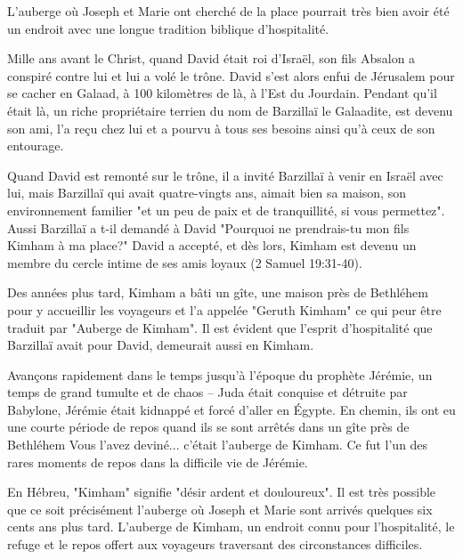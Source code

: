 

L'auberge où Joseph et Marie ont cherché de la place pourrait très bien avoir été un endroit avec une longue tradition biblique d'hospitalité.

Mille ans avant le Christ, quand David était roi d'Israël, son fils Absalon a conspiré contre lui et lui a volé le trône. David s'est alors enfui de Jérusalem pour se cacher en Galaad, à 100 kilomètres de là, à l'Est du Jourdain. Pendant qu'il était là, un riche propriétaire terrien du nom de Barzillaï le Galaadite, est devenu son ami, l'a reçu chez lui et a pourvu à tous ses besoins ainsi qu'à ceux de son entourage.

Quand David est remonté sur le trône, il a invité Barzillaï à venir en Israël avec lui, mais Barzillaï qui avait quatre-vingts ans, aimait bien sa maison, son environnement familier "et un peu de paix et de tranquillité, si vous permettez". Aussi Barzillaï a t-il demandé à David "Pourquoi ne prendrais-tu mon fils Kimham à ma place?" David a accepté, et dès lors, Kimham est devenu un membre du cercle intime de ses amis loyaux (2 Samuel 19:31-40).

Des années plus tard, Kimham a bâti un gîte, une maison près de Bethléhem pour y accueillir les voyageurs et l'a appelée "Geruth Kimham" ce qui peur être traduit par "Auberge de Kimham". Il est évident que l'esprit d'hospitalité que Barzillaï avait pour David, demeurait aussi en Kimham.

Avançons rapidement dans le temps jusqu'à l'époque du prophète Jérémie, un temps de grand tumulte et de chaos – Juda était conquise et détruite par Babylone, Jérémie était kidnappé et forcé d'aller en Égypte. En chemin, ils ont eu une courte période de repos quand ils se sont arrêtés dans un gîte près de Bethléhem Vous l'avez deviné... c'était l'auberge de Kimham. Ce fut l'un des rares moments de repos dans la difficile vie de Jérémie.

En Hébreu, "Kimham" signifie "désir ardent et douloureux". Il est très possible que ce soit précisément l'auberge où Joseph et Marie sont arrivés quelques six cents ans plus tard. L'auberge de Kimham, un endroit connu pour l'hospitalité, le refuge et le repos offert aux voyageurs traversant des circonstances difficiles.

